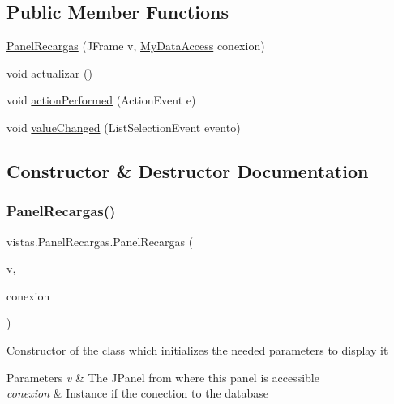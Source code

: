 \subsection*{Public Member Functions}
\begin{DoxyCompactItemize}
\item 
\mbox{\hyperlink{classvistas_1_1_panel_recargas_ae16f46f7e14cd81255a8433cdc439aef}{Panel\+Recargas}} (J\+Frame v, \mbox{\hyperlink{classconexion_s_q_l_1_1_my_data_access}{My\+Data\+Access}} conexion)
\item 
void \mbox{\hyperlink{classvistas_1_1_panel_recargas_a8132b8aab3f57014054fd1bee3cad853}{actualizar}} ()
\item 
void \mbox{\hyperlink{classvistas_1_1_panel_recargas_ad3607075fb4de36ea502e651729b390c}{action\+Performed}} (Action\+Event e)
\item 
void \mbox{\hyperlink{classvistas_1_1_panel_recargas_af1bcd93b4a920d7cafaf6488af2cb6f4}{value\+Changed}} (List\+Selection\+Event evento)
\end{DoxyCompactItemize}


\subsection{Constructor \& Destructor Documentation}
\mbox{\label{classvistas_1_1_panel_recargas_ae16f46f7e14cd81255a8433cdc439aef}} 
\subsubsection{\texorpdfstring{Panel\+Recargas()}{PanelRecargas()}}
{\footnotesize\ttfamily vistas.\+Panel\+Recargas.\+Panel\+Recargas (\begin{DoxyParamCaption}\item[{J\+Frame}]{v,  }\item[{\mbox{\hyperlink{classconexion_s_q_l_1_1_my_data_access}{My\+Data\+Access}}}]{conexion }\end{DoxyParamCaption})}

Constructor of the class which initializes the needed parameters to display it 
\begin{DoxyParams}{Parameters}
{\em v} & The J\+Panel from where this panel is accessible \\
\hline
{\em conexion} & Instance if the conection to the database \\
\hline
\end{DoxyParams}


